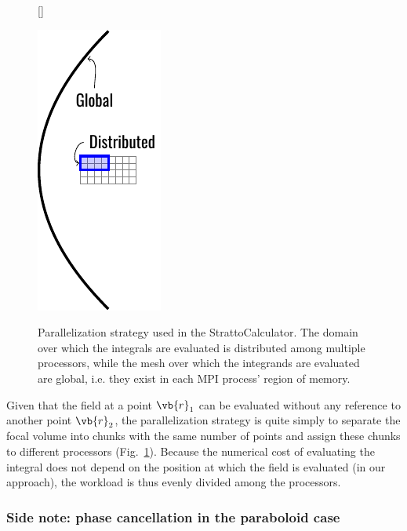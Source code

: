 \documentclass[11pt,SymmetricalJury]{inrsthesis/inrsthesis}
\begin{document}
\begin{figure}
  \centering
  [\FBwidth]
  {\hspace{3cm}\captionsetup{width=0.4\textwidth}
  \caption[Domain decomposition strategy employed in the StrattoCalculator.]
          {Parallelization strategy used in the StrattoCalculator. The domain
          over which the integrals are evaluated is distributed among multiple
          processors, while the mesh over which the integrands are evaluated are
          global, i.e. they exist in each MPI process' region of memory.}
          \label{fig:sc.domain-decomposition}
  }
  {\includegraphics{figs/hpc-domaindecomposition.pdf}}
\end{figure}

Given that the field at a point $\vb{r}_1$ can be evaluated without any reference
to another point $\vb{r}_2$, the parallelization strategy is quite simply to
separate the focal volume into chunks with the same number of points and assign
these chunks to different processors (Fig.~\ref{fig:sc.domain-decomposition}).
Because the numerical cost of evaluating
the integral does not depend on the position at which the field is evaluated
(in our approach), the workload is thus evenly divided among the processors.

\subsubsection{Side note: phase cancellation in the paraboloid case}
\label{sec:sc.phase-cancellation}
\end{document}
